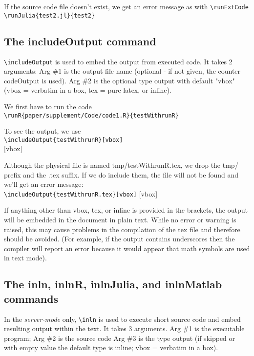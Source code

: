 \documentclass[a4paper,10pt]{article}
\begin{document}
If the source code file doesn't exist, we get an error message as with \verb|\runExtCode|\\
\verb|\runJulia{test2.jl}{test2}|\\



\subsection*{The includeOutput command}
\verb|\includeOutput| is used to embed the output from executed code. It takes 2 arguments:
Arg \#1 is the output file name (optional - if not given, the counter codeOutput is used).
Arg \#2 is the optional type output with default "vbox" (vbox = verbatim in a box, tex = pure latex, or inline).

We first have to run the code\\
\verb|\runR{paper/supplement/Code/code1.R}{testWithrunR}|

To see the output, we use\\
\verb|\includeOutput{testWithrunR}[vbox]|\\
[vbox]

Although the physical file is named tmp/testWithrunR.tex, we drop the tmp/ prefix and the .tex suffix. If we do include them, the file will not be found and we'll get an error message:\\
\verb|\includeOutput{testWithrunR.tex}[vbox]|
[vbox]

If anything other than vbox, tex, or inline is provided in the brackets, the output will be embedded in the document in plain text. While no error or warning is raised, this may cause problems in the compilation of the tex file and therefore should be avoided. (For example, if the output contains underscores then the compiler will report an error because it would appear that math symbols are used in text mode).


\subsection*{The inln, inlnR, inlnJulia, and inlnMatlab commands}
In the \textit{server-mode} only, \verb|\inln| is used to execute short source code and embed resulting output within the text. It takes 3 arguments.
Arg \#1 is the executable program;
Arg \#2 is the source code
Arg \#3 is the type output (if skipped or with empty value the default type is inline; vbox = verbatim in a box).
\end{document}

